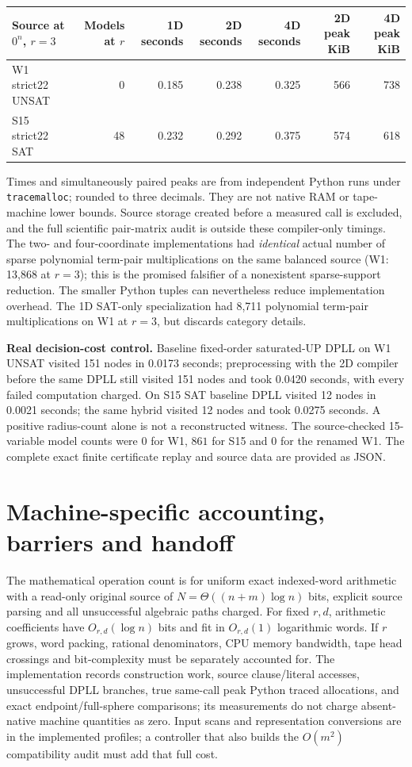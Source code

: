 \documentclass[11pt]{article}
\begin{document}
\begin{center}\small
\begin{tabular}{@{}lrrrrrr@{}}\toprule
Source at $0^n$, $r=3$ & Models at $r$ & 1D seconds & 2D seconds & 4D seconds & 2D peak KiB & 4D peak KiB\\\midrule
W1 strict22 UNSAT &0&0.185&0.238&0.325&566&738\\
S15 strict22 SAT &48&0.232&0.292&0.375&574&618\\\bottomrule
\end{tabular}\end{center}
Times and simultaneously paired peaks are from independent Python runs under \texttt{tracemalloc}; rounded to three decimals. They are not native RAM or tape-machine lower bounds. Source storage created before a measured call is excluded, and the full scientific pair-matrix audit is outside these compiler-only timings. The two- and four-coordinate implementations had \emph{identical} actual number of sparse polynomial term-pair multiplications on the same balanced source (W1: 13,868 at $r=3$); this is the promised falsifier of a nonexistent sparse-support reduction. The smaller Python tuples can nevertheless reduce implementation overhead. The 1D SAT-only specialization had 8,711 polynomial term-pair multiplications on W1 at $r=3$, but discards category details.

\noindent\textbf{Real decision-cost control.} Baseline fixed-order saturated-UP DPLL on W1 UNSAT visited 151 nodes in 0.0173 seconds; preprocessing with the 2D compiler before the same DPLL still visited 151 nodes and took 0.0420 seconds, with every failed computation charged. On S15 SAT baseline DPLL visited 12 nodes in 0.0021 seconds; the same hybrid visited 12 nodes and took 0.0275 seconds. A positive radius-count alone is not a reconstructed witness. The source-checked 15-variable model counts were $0$ for W1, $861$ for S15 and $0$ for the renamed W1. The complete exact finite certificate replay and source data are provided as JSON.

\section{Machine-specific accounting, barriers and handoff}
The mathematical operation count is for uniform exact indexed-word arithmetic with a read-only original source of $N=\Theta((n+m)\log n)$ bits, explicit source parsing and all unsuccessful algebraic paths charged. For fixed $r,d$, arithmetic coefficients have $O_{r,d}(\log n)$ bits and fit in $O_{r,d}(1)$ logarithmic words. If $r$ grows, word packing, rational denominators, CPU memory bandwidth, tape head crossings and bit-complexity must be separately accounted for. The implementation records construction work, source clause/literal accesses, unsuccessful DPLL branches, true same-call peak Python traced allocations, and exact endpoint/full-sphere comparisons; its measurements do not charge absent-native machine quantities as zero. Input scans and representation conversions are in the implemented profiles; a controller that also builds the $O(m^2)$ compatibility audit must add that full cost.
\end{document}
